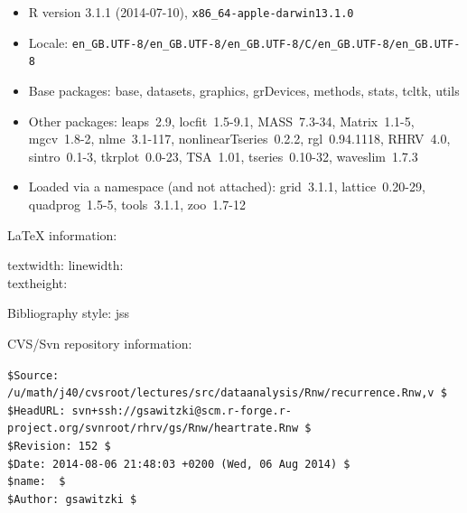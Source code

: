 \documentclass[a4paper, english, utf8]{amsart}
\begin{document}
{\tiny
\begin{itemize}\raggedright
  \item R version 3.1.1 (2014-07-10), \verb|x86_64-apple-darwin13.1.0|
  \item Locale: \verb|en_GB.UTF-8/en_GB.UTF-8/en_GB.UTF-8/C/en_GB.UTF-8/en_GB.UTF-8|
  \item Base packages: base, datasets, graphics, grDevices,
    methods, stats, tcltk, utils
  \item Other packages: leaps~2.9, locfit~1.5-9.1, MASS~7.3-34,
    Matrix~1.1-5, mgcv~1.8-2, nlme~3.1-117,
    nonlinearTseries~0.2.2, rgl~0.94.1118, RHRV~4.0,
    sintro~0.1-3, tkrplot~0.0-23, TSA~1.01, tseries~0.10-32,
    waveslim~1.7.3
  \item Loaded via a namespace (and not attached): grid~3.1.1,
    lattice~0.20-29, quadprog~1.5-5, tools~3.1.1, zoo~1.7-12
\end{itemize}}

\LaTeX{} information:
{\tiny

\currentpage 
textwidth: \prntlen{\textwidth} \qquad 
linewidth:\prntlen{\linewidth}\\
textheight: \prntlen{\textheight}\\
}

Bibliography style: jss

CVS/Svn repository information:

{\tiny%
\noindent
\verb+$Source: /u/math/j40/cvsroot/lectures/src/dataanalysis/Rnw/recurrence.Rnw,v $+\\
\verb!$HeadURL: svn+ssh://gsawitzki@scm.r-forge.r-project.org/svnroot/rhrv/gs/Rnw/heartrate.Rnw $!\\
\verb+$Revision: 152 $+\\
\verb!$Date: 2014-08-06 21:48:03 +0200 (Wed, 06 Aug 2014) $!\\
\verb+$name:  $+\\
\verb+$Author: gsawitzki $+
}
\end{document}
